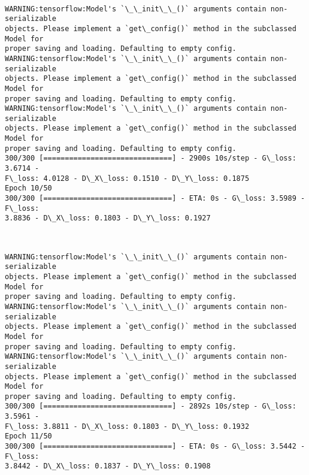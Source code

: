\documentclass[11pt]{article}
\begin{document}
    \begin{center}
    \end{center}
    { \hspace*{\fill} \\}
    
    \begin{Verbatim}[commandchars=\\\{\}]
WARNING:tensorflow:Model's `\_\_init\_\_()` arguments contain non-serializable
objects. Please implement a `get\_config()` method in the subclassed Model for
proper saving and loading. Defaulting to empty config.
WARNING:tensorflow:Model's `\_\_init\_\_()` arguments contain non-serializable
objects. Please implement a `get\_config()` method in the subclassed Model for
proper saving and loading. Defaulting to empty config.
WARNING:tensorflow:Model's `\_\_init\_\_()` arguments contain non-serializable
objects. Please implement a `get\_config()` method in the subclassed Model for
proper saving and loading. Defaulting to empty config.
300/300 [==============================] - 2900s 10s/step - G\_loss: 3.6714 -
F\_loss: 4.0128 - D\_X\_loss: 0.1510 - D\_Y\_loss: 0.1875
Epoch 10/50
300/300 [==============================] - ETA: 0s - G\_loss: 3.5989 - F\_loss:
3.8836 - D\_X\_loss: 0.1803 - D\_Y\_loss: 0.1927
    \end{Verbatim}

    \begin{center}
    \end{center}
    { \hspace*{\fill} \\}
    
    \begin{Verbatim}[commandchars=\\\{\}]
WARNING:tensorflow:Model's `\_\_init\_\_()` arguments contain non-serializable
objects. Please implement a `get\_config()` method in the subclassed Model for
proper saving and loading. Defaulting to empty config.
WARNING:tensorflow:Model's `\_\_init\_\_()` arguments contain non-serializable
objects. Please implement a `get\_config()` method in the subclassed Model for
proper saving and loading. Defaulting to empty config.
WARNING:tensorflow:Model's `\_\_init\_\_()` arguments contain non-serializable
objects. Please implement a `get\_config()` method in the subclassed Model for
proper saving and loading. Defaulting to empty config.
300/300 [==============================] - 2892s 10s/step - G\_loss: 3.5961 -
F\_loss: 3.8811 - D\_X\_loss: 0.1803 - D\_Y\_loss: 0.1932
Epoch 11/50
300/300 [==============================] - ETA: 0s - G\_loss: 3.5442 - F\_loss:
3.8442 - D\_X\_loss: 0.1837 - D\_Y\_loss: 0.1908
    \end{Verbatim}
\end{document}
